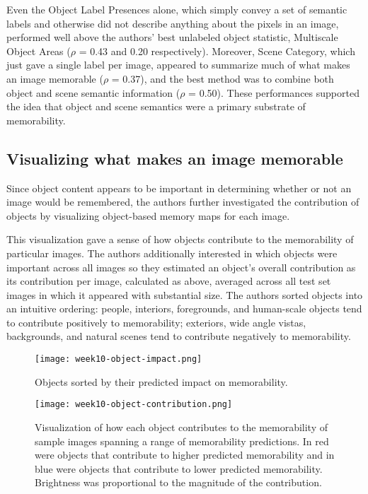 Even the Object Label Presences alone, which simply convey a set of semantic labels and otherwise did not describe anything about the pixels in an image, performed well above the authors' best unlabeled object statistic, Multiscale Object Areas ($\rho$ = 0.43 and 0.20 respectively). Moreover, Scene Category, which just gave a single label per image, appeared to summarize much of what makes an image memorable ($\rho$ = 0.37), and the best method was to combine both object and scene semantic information ($\rho$ = 0.50). These performances supported the idea that object and scene semantics were a primary substrate of memorability.

\subsection{Visualizing what makes an image memorable}
Since object content appears to be important in determining whether or not an image would be remembered, the authors further investigated the contribution of objects by visualizing object-based memory maps for each image.

This visualization gave a sense of how objects contribute
to the memorability of particular images. The authors additionally interested in which objects were important across all images so they estimated an object’s overall contribution as its contribution per image, calculated as above, averaged across all test set images in which it appeared with substantial size. The authors sorted objects into an intuitive ordering: people, interiors, foregrounds, and human-scale objects tend to contribute positively to memorability; exteriors, wide angle vistas, backgrounds, and natural scenes tend to contribute negatively to memorability.

\begin{figure}[!ht]
\centering
\texttt{[image: week10-object-impact.png]}
\caption{Objects sorted by their predicted impact on memorability.}
\end{figure}

\newpage
\begin{figure}[!ht]
\centering
\texttt{[image: week10-object-contribution.png]}
\caption{Visualization of how each object contributes to the memorability of sample images spanning a range of memorability predictions. In red were objects that contribute to higher predicted memorability and in blue were objects that contribute to lower predicted memorability. Brightness was proportional to the magnitude of the contribution.}
\end{figure}